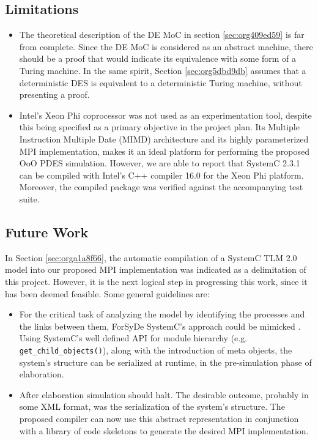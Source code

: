 \documentclass[11pt]{article}
\begin{document}
\subsection{Limitations}
\label{sec:orga8169e8}
\begin{itemize}
\item The theoretical description of the DE MoC in section \ref{sec:org409ed59} is far from complete.
Since the DE MoC is considered as an abstract machine, there should be a proof that would indicate its equivalence with some form of a Turing machine.
In the same spirit, Section \ref{sec:org5dbd9db} assumes that a deterministic DES is equivalent to a deterministic Turing machine, without presenting a proof.

\item Intel's Xeon Phi coprocessor was not used as an experimentation tool, despite this being specified as a primary objective in the project plan.
Its Multiple Instruction Multiple Date (MIMD) architecture and its highly parameterized MPI implementation, makes it an ideal platform for performing the proposed OoO PDES simulation.
However, we are able to report that SystemC 2.3.1 can be compiled with Intel's C++ compiler 16.0 for the Xeon Phi platform. 
Moreover, the compiled package was verified against the accompanying test suite.
\end{itemize}

\subsection{Future Work}
\label{sec:orgc898fcc}
In Section \ref{sec:orga1a8f66}, the automatic compilation of a SystemC TLM 2.0 model into our proposed MPI implementation was indicated as a delimitation of this project.
However, it is the next logical step in progressing this work, since it has been deemed feasible.
Some general guidelines are:
\begin{itemize}
\item For the critical task of analyzing the model by identifying the processes and the links between them,  ForSyDe SystemC's approach could be mimicked \cite{Hosein2012}.
Using SystemC's well defined API for module hierarchy (e.g. \texttt{get\_child\_objects()}), along with the introduction of meta objects, the system's structure can be
serialized at runtime, in the pre-simulation phase of elaboration.
\item After elaboration simulation should halt. The desirable outcome, probably in some XML format, was the serialization of the system's structure. 
The proposed compiler can now use this abstract representation in conjunction with a library of code skeletons to generate the desired MPI implementation.
\end{itemize}
\end{document}
